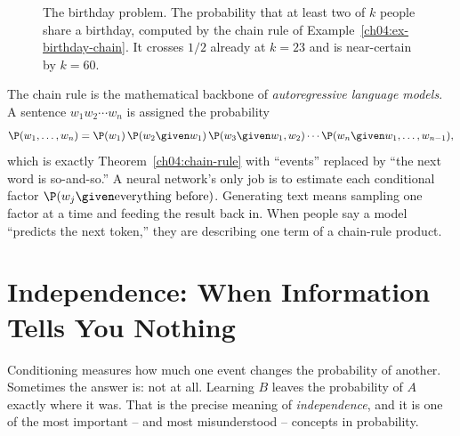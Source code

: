 \begin{figure}[H]
\centering
{}
\caption{The birthday problem. The probability that at least two of $k$ people share a birthday, computed by the chain rule of Example~\ref{ch04:ex-birthday-chain}. It crosses $1/2$ already at $k=23$ and is near-certain by $k=60$.}
\label{ch04:fig-birthday}
\end{figure}

\begin{connectionbox}
The chain rule is the mathematical backbone of \emph{autoregressive language models}. A sentence $w_1 w_2 \cdots w_n$ is assigned the probability
\[
\P(w_1,\dots,w_n) = \P(w_1)\,\P(w_2\given w_1)\,\P(w_3\given w_1,w_2)\cdots\P(w_n \given w_1,\dots,w_{n-1}),
\]
which is exactly Theorem~\ref{ch04:chain-rule} with ``events'' replaced by ``the next word is so-and-so.'' A neural network's only job is to estimate each conditional factor $\P(w_j \given \text{everything before})$. Generating text means sampling one factor at a time and feeding the result back in. When people say a model ``predicts the next token,'' they are describing one term of a chain-rule product.
\end{connectionbox}

\section{Independence: When Information Tells You Nothing}
\label{ch04:independence}

Conditioning measures how much one event changes the probability of another. Sometimes the answer is: not at all. Learning $B$ leaves the probability of $A$ exactly where it was. That is the precise meaning of \emph{independence}, and it is one of the most important -- and most misunderstood -- concepts in probability.

